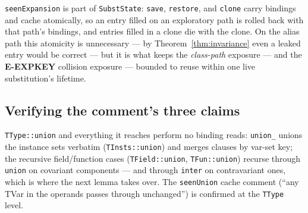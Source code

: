 \documentclass[11pt]{article}
\begin{document}
\begin{corollary}
\label{cor:coherence}
\texttt{seenExpansion} is part of \texttt{SubstState}: \texttt{save},
\texttt{restore}, and \texttt{clone} carry bindings and cache
atomically, so an entry filled on an exploratory path is rolled back
with that path's bindings, and entries filled in a clone die with the
clone. On the alias path this atomicity is unnecessary — by
Theorem~\ref{thm:invariance} even a leaked entry would be correct — but
it is what keeps the \emph{class-path} exposure — and the
\textbf{E-EXPKEY} collision exposure — bounded to reuse within one live
substitution's lifetime.
\end{corollary}

\subsection{Verifying the comment's three claims}

\begin{lemma}
\label{lem:union-blind}
\texttt{TType::union} and everything it reaches perform no binding
reads: \texttt{union\_} unions the instance sets verbatim
(\texttt{TInsts::union}) and merges clauses by var-set key; the
recursive field/function cases (\texttt{TField::union},
\texttt{TFun::union}) recurse through \texttt{union} on covariant
components — and through \texttt{inter} on contravariant ones, which is
where the next lemma takes over. The \texttt{seenUnion} cache comment
(``any TVar in the operands passes through unchanged'') is confirmed at
the \texttt{TType} level.
\end{lemma}
\end{document}

